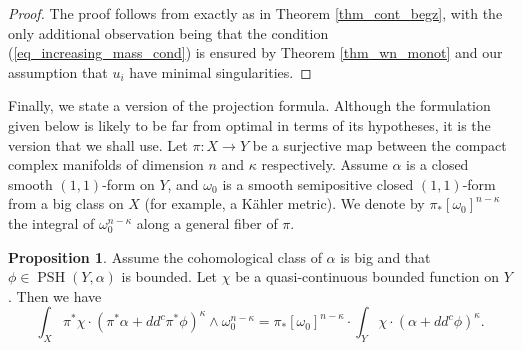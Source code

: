 \documentclass[12pt]{article}
\numberwithin{equation}{section}
\theoremstyle{theorem}
\theoremstyle{definition}
\newtheorem{prop}[thm]{Proposition}
\theoremstyle{remark}
\newcommand{\psh}{\operatorname{PSH}}
\begin{document}
	\begin{proof}
		The proof follows from \cite{DDLSurvey} exactly as in Theorem \ref{thm_cont_begz}, with the only additional observation being that the condition (\ref{eq_increasing_mass_cond}) is ensured by Theorem \ref{thm_wn_monot} and our assumption that $u_i$ have minimal singularities.
	\end{proof}
	\par 
	Finally, we state a version of the projection formula. 
	Although the formulation given below is likely to be far from optimal in terms of its hypotheses, it is the version that we shall use.
	Let $\pi : X \to Y$ be a surjective map between the compact complex manifolds of dimension $n$ and $\kappa$ respectively. 
	Assume $\alpha$ is a closed smooth $(1, 1)$-form on $Y$, and $\omega_0$ is a smooth semipositive closed $(1, 1)$-form from a big class on $X$ (for example, a K\"ahler metric).
	We denote by $\pi_* [\omega_0]^{n - \kappa}$ the integral of $\omega_0^{n - \kappa}$ along a general fiber of $\pi$.
	\begin{prop}\label{prop_proj_fla}
		Assume the cohomological class of $\alpha$ is big and that $\phi \in \psh(Y, \alpha)$ is bounded.
		Let $\chi$ be a quasi-continuous bounded function on $Y$.
		Then we have
		\begin{equation}
			\int_X \pi^* \chi \cdot (\pi^* \alpha + dd^c \pi^* \phi)^{\kappa} \wedge \omega_0^{n - \kappa}
			=
			\pi_*[\omega_0]^{n - \kappa}
			\cdot
			\int_Y \chi \cdot (\alpha + dd^c \phi)^{\kappa}.
		\end{equation}
	\end{prop}
\end{document}
